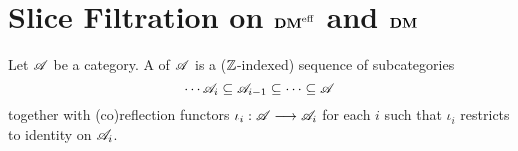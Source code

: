 \newpage
\section{Slice Filtration on $\mathbf{DM}^{\mathrm{eff}}$ and $\mathbf{DM}$}\label{sect_slice_filt_dm}

\begin{defn}\label{def_cat_filtration}
Let $\mathscr{A}$ be a category. A  of $\mathscr{A}$ 
is a ($\mathbb{Z}$-indexed) sequence of subcategories
\[
\cdots \mathscr{A}_i \subseteq \mathscr{A}_{i - 1} \subseteq \cdots 
   \subseteq \mathscr{A}
\]
together with (co)reflection functors $\iota_i: \mathscr{A} \longrightarrow 
\mathscr{A}_{i}$ for each $i$ such that $\iota_i$ restricts to 
identity on $\mathscr{A}_i$.
\end{defn}
